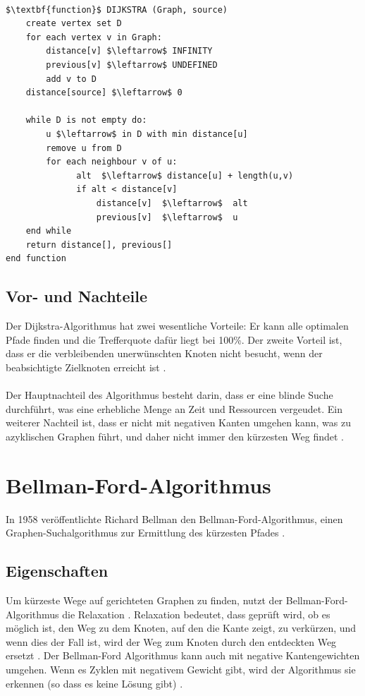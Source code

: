\noindent \\
\begin{minipage}{1.0\textwidth} \small
\begin{lstlisting}
$\textbf{function}$ DIJKSTRA (Graph, source)
	create vertex set D
	for each vertex v in Graph:
		distance[v] $\leftarrow$ INFINITY
		previous[v] $\leftarrow$ UNDEFINED
		add v to D
	distance[source] $\leftarrow$ 0
	
	while D is not empty do:
	    u $\leftarrow$ in D with min distance[u]
	    remove u from D
	    for each neighbour v of u:
	          alt  $\leftarrow$ distance[u] + length(u,v)
	          if alt < distance[v]
	              distance[v]  $\leftarrow$  alt
	              previous[v]  $\leftarrow$  u
	end while
	return distance[], previous[]
end function

\end{lstlisting}
 \label{Dijkstra Algorithmus Pseudocode}
\end{minipage}


\subsection{Vor- und Nachteile}
Der Dijkstra-Algorithmus hat zwei wesentliche Vorteile: Er kann alle optimalen Pfade finden und die Trefferquote dafür liegt
bei 100\%. Der zweite Vorteil ist, dass er die verbleibenden unerwünschten Knoten nicht besucht, wenn der beabsichtigte Zielknoten erreicht
ist \cite{Zhou:19,Abusalim2020}.
\\ \\
Der Hauptnachteil des Algorithmus besteht darin, dass er eine blinde Suche durchführt, was eine erhebliche Menge an Zeit und Ressourcen vergeudet. 
Ein weiterer Nachteil ist, dass er nicht mit negativen Kanten umgehen kann, was zu azyklischen Graphen führt, und daher nicht immer den kürzesten 
Weg findet \cite{Mukhlif:20}.


\section{Bellman-Ford-Algorithmus}
\label{Bellman-Ford-Algorithmus}

In 1958 veröffentlichte Richard Bellman den Bellman-Ford-Algorithmus, einen Graphen-Suchalgorithmus zur Ermittlung des kürzesten 
Pfades \cite{Abusalim2020,Sulaiman18}.
\subsection{Eigenschaften}
Um kürzeste Wege auf gerichteten Graphen zu finden, nutzt der Bellman-Ford-Algorithmus die Relaxation \cite{Vaibhavi2014}.
Relaxation bedeutet, dass geprüft wird, ob es möglich ist, den Weg zu dem Knoten, auf den die Kante zeigt, zu verkürzen, 
und wenn dies der Fall ist, wird der Weg zum Knoten durch den entdeckten Weg ersetzt \cite{Abusalim2020}.
Der Bellman-Ford Algorithmus kann auch mit negative Kantengewichten umgehen. 
Wenn es Zyklen mit negativem Gewicht gibt, wird der Algorithmus sie erkennen (so dass es keine Lösung gibt) \cite{Vaibhavi2014}.

